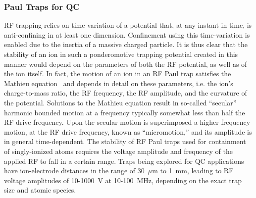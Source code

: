 \documentclass[%
12pt,
 amsmath,amssymb,
]{revtex4-2}
\begin{document}
\subsubsection{Paul Traps for QC}


RF trapping relies on time variation of a potential that, at any instant in time, is anti-confining in at least one dimension.  Confinement using this time-variation is enabled due to the inertia of a massive charged particle.  It is thus clear that the stability of an ion in such a ponderomotive trapping potential created in this manner would depend on the parameters of both the RF potential, as well as of the ion itself.  In fact, the motion of an ion in an RF Paul trap satisfies the Mathieu equation~\cite{Wineland1998} and depends in detail on these parameters, i.e. the ion's charge-to-mass ratio, the RF frequency, the RF amplitude, and the curvature of the potential.  Solutions to the Mathieu equation result in so-called ``secular'' harmonic bounded motion at a frequency typically  somewhat less than half the RF drive frequency.  Upon the secular motion is superimposed a higher frequency motion, at the RF drive frequency, known as ``micromotion,'' and its amplitude is in general time-dependent.  The stability of RF Paul traps used for containment of singly-ionized atoms requires the voltage amplitude and frequency of the applied RF to fall in a certain range.  Traps being explored for QC applications have ion-electrode distances in the range of 30~$\mu$m to 1~mm, leading to RF voltage amplitudes of 10-1000~V at 10-100~MHz, depending on the exact trap size and atomic species.
\end{document}
